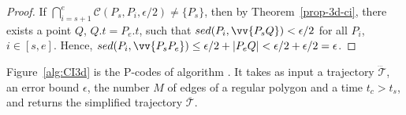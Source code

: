\begin{proof}
If $\bigcap_{i=s+1}^{e}{\mathcal{C}(P_s, P_i, \epsilon/2)} \ne \{P_s\}$, then by Theorem~\ref{prop-3d-ci}, there exists a point $Q$, $Q.t = P_e.t$, such that $sed(P_i, \vv{P_sQ})<\epsilon/2$ for all $P_i$, $i \in [s,e]$. Hence, $sed(P_i, \vv{P_sP_e})\le \epsilon/2 + |P_eQ| < \epsilon/2 + \epsilon/2 = \epsilon$.
\end{proof}



Figure~\ref{alg:CI3d} is the P-codes of algorithm \cist. It takes as input a trajectory $\dddot{\mathcal{T}}$, an error bound $\epsilon$, the number $M$ of edges of a regular polygon and a time $t_c>t_s$, and returns the simplified trajectory $\overline{\mathcal{T}}$.

\begin{figure}[tb!]
\begin{center}
{\small
\begin{minipage}{3.36in}
\myhrule
\vspace{-1ex}
\end{minipage}}
\end{center}
\end{figure}
